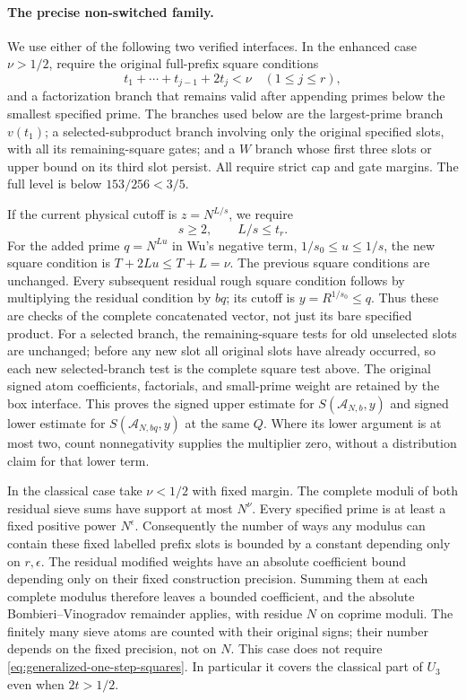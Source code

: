 \documentclass[11pt]{article}
\begin{document}
\paragraph{The precise non-switched family.}
We use either of the following two verified interfaces. In the enhanced
case $\nu>1/2$, require the original full-prefix square conditions
\begin{equation}\label{eq:generalized-one-step-squares}
 t_1+\cdots+t_{j-1}+2t_j<\nu\quad(1\le j\le r),
\end{equation}
and a factorization branch that remains valid after appending primes
below the smallest specified prime. The branches used below are the
largest-prime branch $v(t_1)$; a selected-subproduct branch involving
only the original specified slots, with all its remaining-square
gates; and a $W$ branch whose first three slots or upper bound on its
third slot persist. All require strict cap and gate margins.
The full level is below $153/256<3/5$.

If the current physical cutoff is $z=N^{L/s}$, we require
\begin{equation}\label{eq:generalized-one-step-cutoff}
 s\ge2,\qquad L/s\le t_r.
\end{equation}
For the added prime $q=N^{Lu}$ in Wu's negative term,
$1/s_0\le u\le1/s$, the new square condition is
$T+2Lu\le T+L=\nu$. The previous square conditions are unchanged.
Every subsequent residual rough square condition follows by
multiplying the residual condition by $bq$; its cutoff is
$y=R^{1/s_0}\le q$. Thus these are checks of the complete concatenated
vector, not just its bare specified product. For a selected branch,
the remaining-square tests for old unselected slots are unchanged;
before any new slot all original slots have already occurred, so
each new selected-branch test is the complete square test above.
The original signed atom coefficients, factorials, and small-prime
weight are retained by the box interface. This proves the signed
upper estimate for $S(\mathcal A_{N,b},y)$ and signed lower estimate
for $S(\mathcal A_{N,bq},y)$ at the same $Q$.
Where its lower argument is at most two, count nonnegativity supplies
the multiplier zero, without a distribution claim for that lower term.

In the classical case take $\nu<1/2$ with fixed margin. The complete
moduli of both residual sieve sums have support at most $N^\nu$.
Every specified prime is at least a fixed positive power $N^\epsilon$.
Consequently the number of ways any modulus can contain these fixed
labelled prefix slots is bounded by a constant depending only on
$r,\epsilon$. The residual modified weights have an absolute
coefficient bound depending only on their fixed construction
precision. Summing them at each complete modulus therefore leaves a
bounded coefficient, and the absolute Bombieri--Vinogradov remainder
applies, with residue $N$ on coprime moduli. The finitely many sieve
atoms are counted with their original signs; their number depends on
the fixed precision, not on $N$. This case does not require
\eqref{eq:generalized-one-step-squares}. In particular it covers the
classical part of $U_3$ even when $2t>1/2$.
\end{document}

